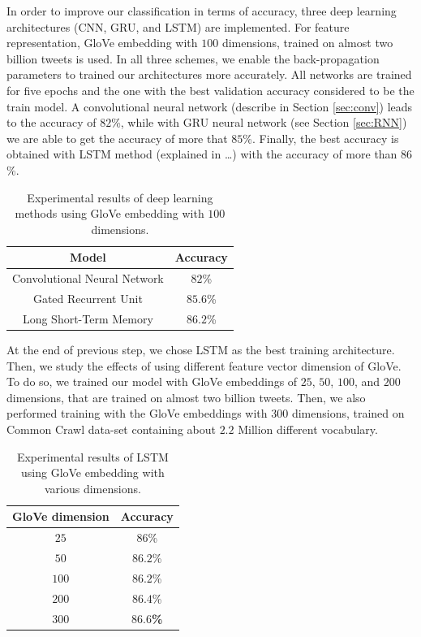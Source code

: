 \documentclass[8pt,conference,compsocconf]{IEEEtran}
\begin{document}
In order to improve our classification in terms of accuracy, three deep learning architectures (CNN, GRU, and LSTM) are implemented. For feature representation, GloVe embedding with $100$ dimensions, trained on almost two billion tweets is used. In all three schemes, we enable the back-propagation parameters to trained our architectures more accurately. All networks are trained for five epochs and the one with the best validation accuracy considered to be the train model. A convolutional neural network (describe in Section \ref{sec:conv}) leads to the accuracy of $82$\%, while with GRU neural network (see Section \ref{sec:RNN}) we are able to get the accuracy of more that $85$\%. Finally, the best accuracy is obtained with LSTM method (explained in …) with the accuracy of more than $86$\%.
\begin{table}[h]
	\centering
	\caption{Experimental results of deep learning methods using GloVe embedding with $100$ dimensions.}
	\begin{tabular}{|c||c|}
		\hline
		Model &Accuracy\\
		\hline
		Convolutional Neural Network&  $82$\% \\ 
		\hline
		Gated Recurrent Unit&  $85.6$\% \\ 
		\hline
		Long Short-Term Memory&  $86.2$\% \\ 
		\hline
	\end{tabular}
	\label{tab:deeplearning_accuracy}
\end{table}

At the end of previous step, we chose LSTM as the best training architecture. Then, we study the effects of using different feature vector dimension of GloVe. To do so, we trained our model with GloVe embeddings of $25$, $50$, $100$, and $200$ dimensions, that are trained on almost two billion tweets. Then, we also performed training with the GloVe embeddings with $300$ dimensions, trained on Common Crawl data-set containing about $2.2$ Million different vocabulary. 

\begin{table}[h]
	\centering
	\caption{Experimental results of LSTM using GloVe embedding with various dimensions.}
	\begin{tabular}{|c||c|}
		\hline
		GloVe dimension &Accuracy\\
		\hline
		$25$ &  $86$\% \\ 
		\hline
		$50$ &  $86.2$\% \\ 
		\hline
		$100$ &  $86.2$\% \\ 
		\hline
		$200$ &  $86.4$\% \\ 
		\hline
		\textbf{$300$} &  \textbf{$86.6$\%} \\ 
		\hline
	\end{tabular}
	\label{tab:lstm_accuracy}
\end{table}
\end{document}

